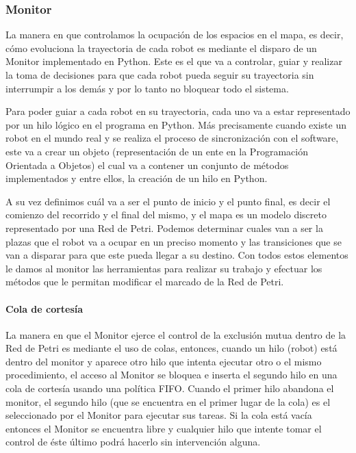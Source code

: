 \subsubsection{Monitor}

La manera en que controlamos la ocupación de los espacios en el mapa, es decir, cómo evoluciona la trayectoria de cada robot es mediante el disparo de un Monitor implementado en Python. Este es el que va a controlar, guiar y realizar la toma de decisiones para que cada robot pueda seguir su trayectoria sin interrumpir a los demás y por lo tanto no bloquear todo el sistema.

Para poder guiar a cada robot en su trayectoria, cada uno va a estar representado por un hilo lógico en el programa en Python. Más precisamente cuando existe un robot en el mundo real y se realiza el proceso de sincronización con el software, este va a crear un objeto (representación de un ente en la Programación Orientada a Objetos) el cual va a contener un conjunto de métodos implementados y entre ellos, la creación de un hilo en Python.

A su vez definimos cuál va a ser el punto de inicio y el punto final, es decir el comienzo del recorrido y el final del mismo, y el mapa es un modelo discreto representado por una Red de Petri. Podemos determinar cuales van a ser la plazas que el robot va a ocupar en un preciso momento y las transiciones que se van a disparar para que este pueda llegar a su destino. Con todos estos elementos le damos al monitor las herramientas para realizar su trabajo y efectuar los métodos que le permitan modificar el marcado de la Red de Petri.

\paragraph{Cola de cortesía} \mbox{} \vspace{8pt}

La manera en que el Monitor ejerce el control de la exclusión mutua dentro de la Red de Petri es mediante el uso de colas, entonces, cuando un hilo (robot) está dentro del monitor y aparece otro hilo que intenta ejecutar otro o el mismo procedimiento, el acceso al Monitor se bloquea e inserta el segundo hilo en una cola de cortesía usando una política FIFO. Cuando el primer hilo abandona el monitor, el segundo hilo (que se encuentra en el primer lugar de la cola) es el seleccionado por el Monitor para ejecutar sus tareas. Si la cola está vacía entonces el Monitor se encuentra libre y cualquier hilo que intente tomar el control de éste último podrá hacerlo sin intervención alguna.

